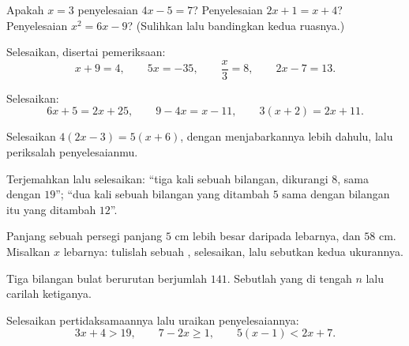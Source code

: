 \begin{exercise}[$\star$]\label{exo:g8:equations:3}
Apakah $x = 3$ penyelesaian $4x - 5 = 7$? Penyelesaian
$2x + 1 = x + 4$? Penyelesaian $x^2 = 6x - 9$? (Sulihkan lalu
bandingkan kedua ruasnya.)
\end{exercise}

\begin{exercise}[$\star$]\label{exo:g8:equations:4}
Selesaikan, disertai pemeriksaan:
\[
x + 9 = 4, \qquad
5x = -35, \qquad
\frac{x}{3} = 8, \qquad
2x - 7 = 13 .
\]
\end{exercise}

\begin{exercise}[$\star$]\label{exo:g8:equations:5}
Selesaikan:
\[
6x + 5 = 2x + 25, \qquad
9 - 4x = x - 11, \qquad
3(x + 2) = 2x + 11 .
\]
\end{exercise}

\begin{exercise}[$\star$]\label{exo:g8:equations:6}
Selesaikan $4(2x - 3) = 5(x + 6)$, dengan menjabarkannya lebih
dahulu, lalu periksalah penyelesaianmu.
\end{exercise}

\begin{exercise}[$\star$]\label{exo:g8:equations:7}
Terjemahkan lalu selesaikan: ``tiga kali sebuah bilangan, dikurangi
$8$, sama dengan $19$''; ``dua kali sebuah bilangan yang ditambah $5$
sama dengan bilangan itu yang ditambah $12$''.
\end{exercise}

\begin{exercise}[$\star\star$]\label{exo:g8:equations:8}
Panjang sebuah persegi panjang $5$ cm lebih besar daripada lebarnya,
dan  $58$ cm. Misalkan $x$ lebarnya: tulislah sebuah
, selesaikan, lalu sebutkan kedua ukurannya.
\end{exercise}

\begin{exercise}[$\star\star$]\label{exo:g8:equations:9}
Tiga bilangan bulat berurutan berjumlah $141$. Sebutlah yang di
tengah $n$ lalu carilah ketiganya.
\end{exercise}

\begin{exercise}[$\star\star$]\label{exo:g8:equations:10}
Selesaikan pertidaksamaannya lalu uraikan penyelesaiannya:
\[
3x + 4 > 19, \qquad
7 - 2x \geq 1, \qquad
5(x - 1) < 2x + 7 .
\]
\end{exercise}

